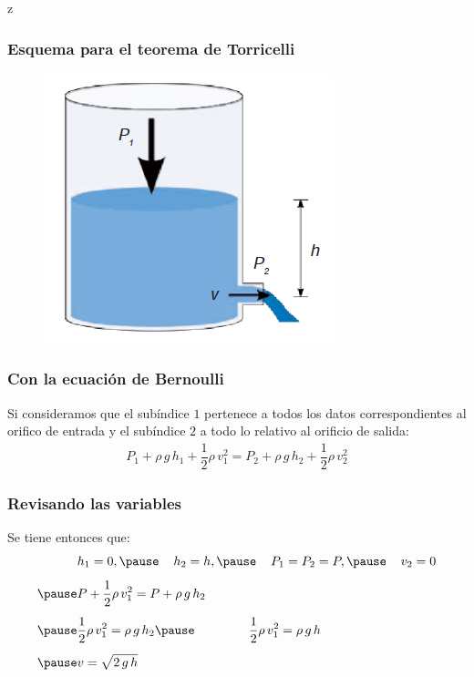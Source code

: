 z\documentclass[14pt]{beamer}
\begin{document}
\begin{frame}
\frametitle{Esquema para el teorema de Torricelli}
\begin{figure}
    \centering
    \includegraphics[scale=0.75]{Imagenes/Ejercicio_Torricelli.png}
\end{figure}
\end{frame}
\begin{frame}
\frametitle{Con la ecuación de Bernoulli}
Si consideramos que el subíndice $1$ pertenece a todos los datos correspondientes al orifico de entrada y el subíndice $2$ a todo lo relativo al orificio de salida:
\pause
\begin{align*}
P_{1} + \rho \, g \, h_{1} + \dfrac{1}{2} \rho \, v_{1}^{2} = P_{2} + \rho \, g \, h_{2} + \dfrac{1}{2} \rho \, v_{2}^{2}
\end{align*}    
\end{frame}
\begin{frame}
\frametitle{Revisando las variables}
Se tiene entonces que:
\pause
\begin{eqnarray*}
\begin{aligned}
&h_{1} = 0, \pause \hspace*{0.4cm} h_{2} = h, \pause \hspace*{0.4cm} P_{1} = P_{2} = P, \pause \hspace*{0.4cm} v_{2} = 0 \\[0.5em] \pause
&P + \dfrac{1}{2} \rho \, v_{1}^{2} = P + \rho \, g \, h_{2} \\[0.5em] \pause
&\dfrac{1}{2} \rho \, v_{1}^{2} = \rho \, g \, h_{2} \pause \hspace{1.5cm} \dfrac{1}{2} \rho \, v_{1}^{2} = \rho \, g \, h \\[0.5em] \pause
&v = \sqrt{ 2 \, g \, h}
\end{aligned}
\end{eqnarray*}
\end{frame}
\end{document}
